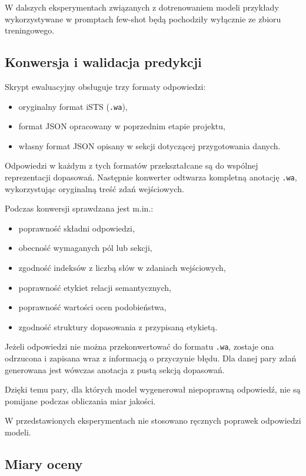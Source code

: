 \documentclass[a4paper,10pt]{article}
\begin{document}
W dalszych eksperymentach związanych z dotrenowaniem
modeli przykłady wykorzystywane w promptach few-shot
będą pochodziły wyłącznie ze zbioru treningowego.


\subsection{Konwersja i walidacja predykcji}

Skrypt ewaluacyjny obsługuje trzy formaty odpowiedzi:

\begin{itemize}
    \item oryginalny format iSTS (\texttt{.wa}),
    \item format JSON opracowany w poprzednim
    etapie projektu,
    \item własny format JSON opisany w sekcji
    dotyczącej przygotowania danych.
\end{itemize}

Odpowiedzi w każdym z tych formatów przekształcane
są do wspólnej reprezentacji dopasowań. Następnie
konwerter odtwarza kompletną anotację \texttt{.wa},
wykorzystując oryginalną treść zdań wejściowych.

Podczas konwersji sprawdzana jest m.in.:

\begin{itemize}
    \item poprawność składni odpowiedzi,
    \item obecność wymaganych pól lub sekcji,
    \item zgodność indeksów z liczbą słów
    w zdaniach wejściowych,
    \item poprawność etykiet relacji semantycznych,
    \item poprawność wartości ocen podobieństwa,
    \item zgodność struktury dopasowania
    z przypisaną etykietą.
\end{itemize}

Jeżeli odpowiedzi nie można przekonwertować do formatu
\texttt{.wa}, zostaje ona odrzucona i zapisana wraz
z informacją o przyczynie błędu. Dla danej pary zdań
generowana jest wówczas anotacja z pustą sekcją
dopasowań.

Dzięki temu pary, dla których model wygenerował
niepoprawną odpowiedź, nie są pomijane podczas
obliczania miar jakości.

W przedstawionych eksperymentach nie stosowano
ręcznych poprawek odpowiedzi modeli.


\subsection{Miary oceny}
\end{document}
